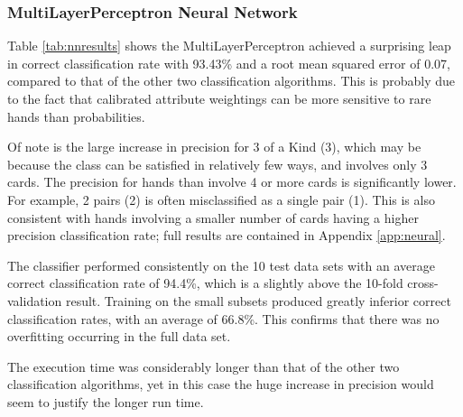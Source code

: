 \documentclass[10pt, a4paper]{article}
\begin{document}
\subsubsection*{MultiLayerPerceptron Neural Network}

Table \ref{tab:nnresults} shows the MultiLayerPerceptron achieved a surprising leap in correct classification rate with 93.43\% and a root mean squared error of 0.07, compared to that of the other two classification algorithms. This is probably due to the fact that calibrated attribute weightings can be more sensitive to rare hands than probabilities.

Of note is the large increase in precision for 3 of a Kind (3), which may be because the class can be satisfied in relatively few ways, and involves only 3 cards. The precision for hands than involve 4 or more cards is significantly lower. For example, 2 pairs (2) is often misclassified as a single pair (1). This is also consistent with hands involving a smaller number of cards having a higher precision classification rate; full results are contained in Appendix \ref{app:neural}.

The classifier performed consistently on the 10 test data sets with an average correct classification rate of 94.4\%, which is a slightly above the 10-fold cross-validation result. Training on the small subsets produced greatly inferior correct classification rates, with an average of 66.8\%. This confirms that there was no overfitting occurring in the full data set.

The execution time was considerably longer than that of the other two classification algorithms, yet in this case the huge increase in precision would seem to justify the longer run time.
                 
\end{document}
